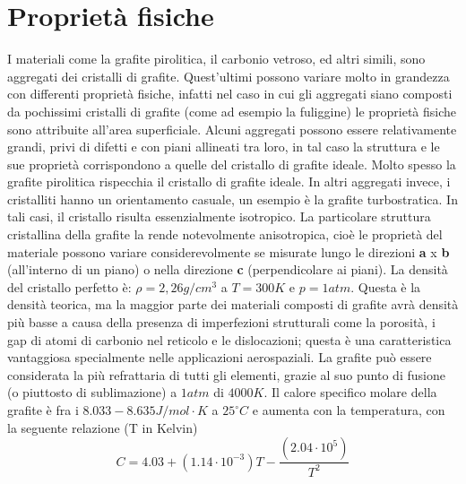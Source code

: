 \documentclass[a4paper,titlepage]{book}
\begin{document}
\section{Proprietà fisiche}
I materiali come la grafite pirolitica, il carbonio vetroso, ed altri simili, sono aggregati dei cristalli di grafite. Quest'ultimi possono variare molto in grandezza con differenti proprietà fisiche, infatti nel caso in cui gli aggregati siano composti da pochissimi cristalli di grafite (come ad esempio la fuliggine) le proprietà fisiche sono attribuite all'area superficiale.
Alcuni aggregati possono essere relativamente grandi, privi di difetti e con piani allineati tra loro, in tal caso la struttura e le sue proprietà corrispondono a quelle del cristallo di grafite ideale. Molto spesso la grafite pirolitica rispecchia il cristallo di grafite ideale. In altri aggregati invece, i cristalliti hanno un orientamento casuale, un esempio è la grafite turbostratica. In tali casi, il cristallo risulta essenzialmente isotropico. 
La particolare struttura cristallina della grafite la rende notevolmente anisotropica, cioè le proprietà del materiale possono variare considerevolmente se misurate lungo le direzioni \textbf{a} x \textbf{b} (all'interno di un piano) o nella direzione \textbf{c} (perpendicolare ai piani). 
La densità del cristallo perfetto è: $\rho=2,26 g / cm^3$ a $T = 300 K$ e $p = 1 atm$. Questa è la densità teorica, ma la maggior parte dei materiali composti di grafite avrà densità più basse a causa della presenza di imperfezioni strutturali come la porosità, i gap di atomi di carbonio nel reticolo e le dislocazioni; questa è una caratteristica vantaggiosa specialmente nelle applicazioni aerospaziali. La grafite può essere considerata la più refrattaria di tutti gli elementi, grazie al suo punto di fusione (o piuttosto di sublimazione) a $1 atm$ di $4000K$.
Il calore specifico molare della grafite è fra i $8.033 - 8.635 J/mol \cdot K$ a $25 ^\circ C$ e aumenta con la temperatura, con la seguente relazione (T in Kelvin)
\begin{equation}
C=4.03+(1.14 \cdot 10^{-3})T- \frac{(2.04 \cdot 10^5)}{T^2}
\end{equation}
\end{document}
